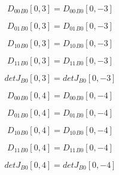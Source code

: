 \documentclass{article}
\begin{document}
\begin{dmath}{D_{00}{_{B0}}}[{0,3}] = {D_{00}{_{B0}}}[{0,-3}]\end{dmath}

\begin{dmath}{D_{01}{_{B0}}}[{0,3}] = {D_{01}{_{B0}}}[{0,-3}]\end{dmath}

\begin{dmath}{D_{10}{_{B0}}}[{0,3}] = {D_{10}{_{B0}}}[{0,-3}]\end{dmath}

\begin{dmath}{D_{11}{_{B0}}}[{0,3}] = {D_{11}{_{B0}}}[{0,-3}]\end{dmath}

\begin{dmath}{detJ{_{B0}}}[{0,3}] = {detJ{_{B0}}}[{0,-3}]\end{dmath}

\begin{dmath}{D_{00}{_{B0}}}[{0,4}] = {D_{00}{_{B0}}}[{0,-4}]\end{dmath}

\begin{dmath}{D_{01}{_{B0}}}[{0,4}] = {D_{01}{_{B0}}}[{0,-4}]\end{dmath}

\begin{dmath}{D_{10}{_{B0}}}[{0,4}] = {D_{10}{_{B0}}}[{0,-4}]\end{dmath}

\begin{dmath}{D_{11}{_{B0}}}[{0,4}] = {D_{11}{_{B0}}}[{0,-4}]\end{dmath}

\begin{dmath}{detJ{_{B0}}}[{0,4}] = {detJ{_{B0}}}[{0,-4}]\end{dmath}
\end{document}
